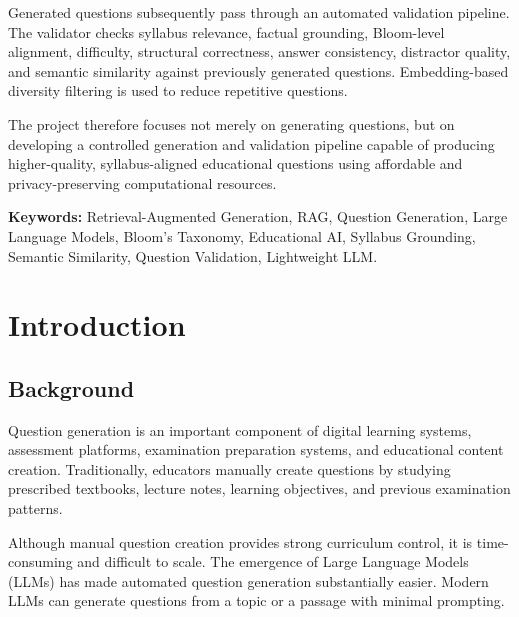 \documentclass[12pt,a4paper]{report}
\begin{document}
Generated questions subsequently pass through an automated validation pipeline. The validator checks syllabus relevance, factual grounding, Bloom-level alignment, difficulty, structural correctness, answer consistency, distractor quality, and semantic similarity against previously generated questions. Embedding-based diversity filtering is used to reduce repetitive questions.

The project therefore focuses not merely on generating questions, but on developing a controlled generation and validation pipeline capable of producing higher-quality, syllabus-aligned educational questions using affordable and privacy-preserving computational resources.

\textbf{Keywords:} Retrieval-Augmented Generation, RAG, Question Generation, Large Language Models, Bloom's Taxonomy, Educational AI, Syllabus Grounding, Semantic Similarity, Question Validation, Lightweight LLM.


\tableofcontents
\newpage

\listoffigures
\newpage

\listoftables
\newpage


\chapter{Introduction}

\section{Background}

Question generation is an important component of digital learning systems, assessment platforms, examination preparation systems, and educational content creation. Traditionally, educators manually create questions by studying prescribed textbooks, lecture notes, learning objectives, and previous examination patterns.

Although manual question creation provides strong curriculum control, it is time-consuming and difficult to scale. The emergence of Large Language Models (LLMs) has made automated question generation substantially easier. Modern LLMs can generate questions from a topic or a passage with minimal prompting.
\end{document}
